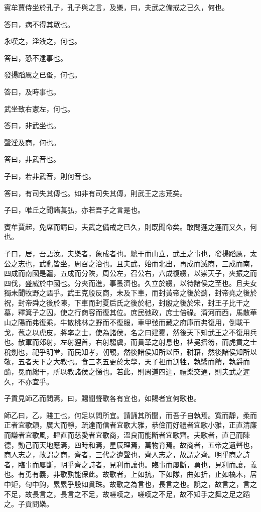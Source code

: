 賓牟賈侍坐於孔子，孔子與之言，及樂，曰，夫武之備戒之已久，何也。

答曰，病不得其眾也。

永嘆之，淫液之，何也。

答曰，恐不逮事也。

發揚蹈厲之已蚤，何也。

答曰，及時事也。

武坐致右憲左，何也。

答曰，非武坐也。

聲淫及商，何也。

答曰，非武音也。

子曰，若非武音，則何音也。

答曰，有司失其傳也。如非有司失其傳，則武王之志荒矣。

子曰，唯丘之聞諸萇弘，亦若吾子之言是也。

賓牟賈起，免席而請曰，夫武之備戒之已久，則既聞命矣。敢問遲之遲而又久，何也。

子曰，居，吾語汝。夫樂者，象成者也。總干而山立，武王之事也，發揚蹈厲，太公之志也，武亂皆坐，周召之治也。且夫武，始而北出，再成而滅商，三成而南，四成而南國是疆，五成而分陜，周公左，召公右，六成復綴，以崇天子，夾振之而四伐，盛威於中國也。分夾而進，事蚤濟也。久立於綴，以待諸侯之至也。且夫女獨未聞牧野之語乎。武王克殷反商，未及下車，而封黃帝之後於薊，封帝堯之後於祝，封帝舜之後於陳，下車而封夏后氏之後於杞，封殷之後於宋，封王子比干之墓，釋箕子之囚，使之行商容而復其位。庶民弛政，庶士倍祿。濟河而西，馬散華山之陽而弗復乘，牛散桃林之野而不復服，車甲弢而藏之府庫而弗復用，倒載干戈，苞之以虎皮，將率之士，使為諸侯，名之曰建櫜，然後天下知武王之不復用兵也。散軍而郊射，左射貍首，右射騶虞，而貫革之射息也，裨冕搢笏，而虎賁之士稅劍也，祀乎明堂，而民知孝，朝覲，然後諸侯知所以臣，耕藉，然後諸侯知所以敬，五者天下之大教也。食三老五更於太學，天子袒而割牲，執醬而饋，執爵而酳，冕而總干，所以教諸侯之悌也。若此，則周道四達，禮樂交通，則夫武之遲久，不亦宜乎。

子貢見師乙而問焉，曰，賜聞聲歌各有宜也，如賜者宜何歌也。

師乙曰，乙，賤工也，何足以問所宜。請誦其所聞，而吾子自執焉。寬而靜，柔而正者宜歌頌，廣大而靜，疏達而信者宜歌大雅，恭儉而好禮者宜歌小雅，正直清廉而謙者宜歌風，肆直而慈愛者宜歌商，溫良而能斷者宜歌齊。夫歌者，直己而陳德，動己而天地應焉，四時和焉，星辰理焉，萬物育焉。故商者，五帝之遺聲也，商人志之，故謂之商，齊者，三代之遺聲也，齊人志之，故謂之齊。明乎商之詩者，臨事而屢斷，明乎齊之詩者，見利而讓也。臨事而屢斷，勇也，見利而讓，義也。有勇有義，非歌孰能保此。故歌者，上如抗，下如隊，曲如折，止如槁木，居中矩，句中鉤，累累乎殷如貫珠。故歌之為言也，長言之也。說之，故言之，言之不足，故長言之，長言之不足，故嗟嘆之，嗟嘆之不足，故不知手之舞之足之蹈之。子貢問樂。

